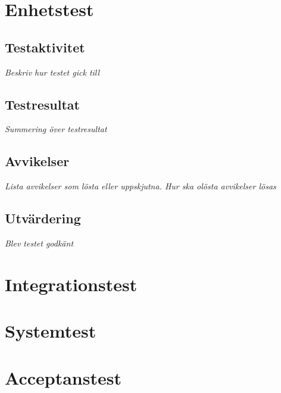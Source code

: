\documentclass[a4paper,10pt]{article}
\begin{document}




\section{Enhetstest}
\subsection{Testaktivitet}
\emph{Beskriv hur testet gick till}
\subsection{Testresultat}
\emph{Summering över testresultat}
\subsection{Avvikelser}
\emph{Lista avvikelser som lösta eller uppskjutna. Hur ska olösta avvikelser lösas}
\subsection{Utvärdering}
\emph{Blev testet godkänt}
\section{Integrationstest}
\section{Systemtest}
\section{Acceptanstest}
\end{document}
